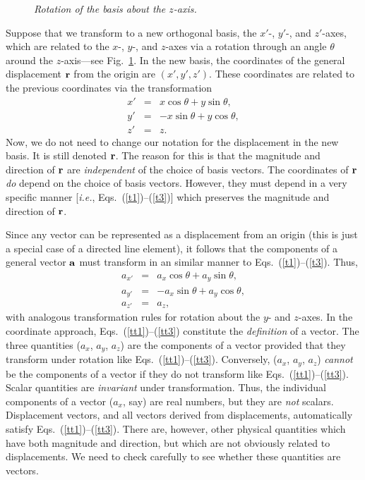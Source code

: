 \begin{figure}
\epsfysize=2in
\centerline{}
\caption{\em Rotation of the basis about the $z$-axis.}\label{f3}
\end{figure}
Suppose that we transform to a new orthogonal basis, the $x'$-, $y'$-, and $z'$-axes,
which are related to the $x$-, $y$-, and $z$-axes via  a rotation through an angle
$\theta$ around the $z$-axis---see Fig.~\ref{f3}.
In the new basis, the coordinates of the general displacement ${\bf r}$ from the
origin are $(x', y', z')$. These coordinates are related to the previous
coordinates via the transformation
\begin{eqnarray}
x' &=& x\cos\theta + y\sin \theta,\label{t1}\\[0.5ex]
y' &=& -x\sin\theta + y\cos\theta,\\[0.5ex]
z' &=& z.\label{t3}
\end{eqnarray}
Now, we do not need to change our notation for the displacement in the new basis.
It is still denoted ${\bf r}$. The reason for this is that the magnitude and
direction of ${\bf r}$ are {\em independent}\/ of the choice of basis vectors. The
coordinates of ${\bf r}$ {\em do}\/ depend on the choice of basis vectors.
However, they must depend in a very specific manner [{\em i.e.}, Eqs.~(\ref{t1})--(\ref{t3})] which
preserves the magnitude and direction of ${\bf r}$.

Since any vector can be represented as a displacement from an origin
(this is just a special case of a directed line element), it follows that
the 
components of a general vector ${\bf a}$ must transform in an similar
manner to Eqs.~(\ref{t1})--(\ref{t3}). Thus,
\begin{eqnarray}
a_{x'} &=& a_x\cos\theta + a_y\sin \theta,\label{tt1}\\[0.5ex]
a_{y'} &=& -a_x\sin\theta + a_y\cos\theta,\\[0.5ex]
a_{z'} &=& a_z,\label{tt3}
\end{eqnarray}
with analogous transformation rules for rotation about the $y$- and $z$-axes.
In the coordinate approach, Eqs.~(\ref{tt1})--(\ref{tt3}) constitute the {\em definition} of a vector.
 The three
quantities ($a_x$, $a_y$, $a_z$) are the components of a vector provided that
they transform under rotation like Eqs.~(\ref{tt1})--(\ref{tt3}). 
Conversely, ($a_x$, $a_y$, $a_z$) {\em cannot} be the components of a vector if they
do not transform like Eqs.~(\ref{tt1})--(\ref{tt3}). Scalar quantities are {\em invariant}
 under transformation.
Thus, the individual components of a vector ($a_x$, say) are real numbers, but 
they are
{\em not}\/ scalars.
Displacement vectors, and all vectors derived from
displacements, automatically satisfy Eqs.~(\ref{tt1})--(\ref{tt3}). There are, however, other
physical quantities which have both magnitude and direction, but which are not
obviously related to displacements. We need to check carefully to see whether these
quantities are vectors. 

